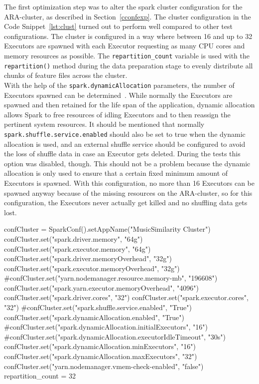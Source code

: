 \noindent The first optimization step was to alter the spark cluster configuration for the ARA-cluster, as described in Section~\ref{cconfexp}.
\noindent The cluster configuration in the Code Snippet~\ref{lst:clust} turned out to perform well compared to other test configurations. The cluster is configured in a way where between 16 and up to 32 Executors are spawned with each Executor requesting as many CPU cores and memory resources as possible. The \lstinline{repartition_count} variable is used with the \lstinline{repartition()} method during the data preparation stage to evenly distribute all chunks of feature files across the cluster.\\
\noindent With the help of the \lstinline{spark.dynamicAllocation} parameters, the number of Executors spawned can be determined~\cite[p. 153]{sparkbook1}. While normally the Executors are spawned and then retained for the life span of the application, dynamic allocation allows Spark to free resources of idling Executors and to then reassign the pertinent system resources.
It should be mentioned that normally \lstinline{spark.shuffle.service.enabled} should also be set to true when the dynamic allocation is used, and an external shuffle service should be configured to avoid the loss of shuffle data in case an Executor gets deleted. During the tests this option was disabled, though. This should not be a problem because the dynamic allocation is only used to ensure that a certain fixed minimum amount of Executors is spawned. With this configuration, no more than 16 Executors can be spawned anyway because of the missing resources on the ARA-cluster, so for this configuration, the Executors never actually get killed and no shuffling data gets lost.\\

\begin{pythonCode}[frame=single,label={lst:clust},caption={Cluster setup},captionpos=b]
confCluster = SparkConf().setAppName("MusicSimilarity Cluster")
confCluster.set("spark.driver.memory", "64g")
confCluster.set("spark.executor.memory", "64g")
confCluster.set("spark.driver.memoryOverhead", "32g")
confCluster.set("spark.executor.memoryOverhead", "32g")
#confCluster.set("yarn.nodemanager.resource.memory-mb", "196608")
confCluster.set("spark.yarn.executor.memoryOverhead", "4096")
confCluster.set("spark.driver.cores", "32")
confCluster.set("spark.executor.cores", "32")
#confCluster.set("spark.shuffle.service.enabled", "True")
confCluster.set("spark.dynamicAllocation.enabled", "True")
#confCluster.set("spark.dynamicAllocation.initialExecutors", "16")
#confCluster.set("spark.dynamicAllocation.executorIdleTimeout", "30s")	
confCluster.set("spark.dynamicAllocation.minExecutors", "16")
confCluster.set("spark.dynamicAllocation.maxExecutors", "32")
confCluster.set("yarn.nodemanager.vmem-check-enabled", "false")
repartition_count = 32
\end{pythonCode}

